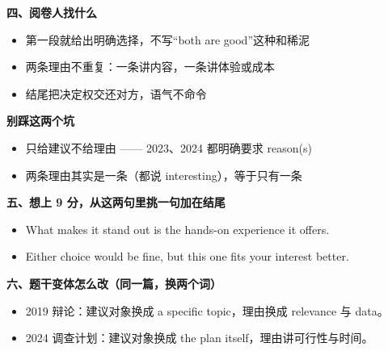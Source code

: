 \documentclass[11pt,a4paper]{ctexart}
\begin{document}
\vspace{5pt}
\noindent\begin{minipage}[t]{0.555\linewidth}
{\color{accent}\bfseries 四、阅卷人找什么}\par
{\footnotesize\begin{itemize}[leftmargin=1.2em,itemsep=1pt,topsep=1pt,parsep=0pt]\setlength{\leftmargin}{1.1em}
\item 第一段就给出明确选择，不写“both are good”这种和稀泥
\item 两条理由不重复：一条讲内容，一条讲体验或成本
\item 结尾把决定权交还对方，语气不命令
\end{itemize}}
\end{minipage}\hfill
\begin{minipage}[t]{0.415\linewidth}
{\color{hot}\bfseries 别踩这两个坑}\par
{\footnotesize\begin{itemize}[leftmargin=1.2em,itemsep=1pt,topsep=1pt,parsep=0pt]\setlength{\leftmargin}{1.1em}
\item 只给建议不给理由 —— 2023、2024 都明确要求 reason(s)
\item 两条理由其实是一条（都说 interesting），等于只有一条
\end{itemize}}
\end{minipage}\par

\vspace{6pt}
{\color{accent}\bfseries 五、想上 9 分，从这两句里挑一句加在结尾}\par
\vspace{2pt}
{\footnotesize
\begin{itemize}[leftmargin=1.2em,itemsep=1.5pt,topsep=1pt,parsep=0pt]
\item What makes it stand out is the hands-on experience it offers.
\item Either choice would be fine, but this one fits your interest better.
\end{itemize}}\par

\vspace{6pt}
{\color{accent}\bfseries 六、题干变体怎么改（同一篇，换两个词）}\par
\vspace{2pt}
{\footnotesize
\begin{itemize}[leftmargin=1.2em,itemsep=1.5pt,topsep=1pt,parsep=0pt]
\item 2019 辩论：建议对象换成 a specific topic，理由换成 relevance 与 data。
\item 2024 调查计划：建议对象换成 the plan itself，理由讲可行性与时间。
\end{itemize}}\par
\end{document}
